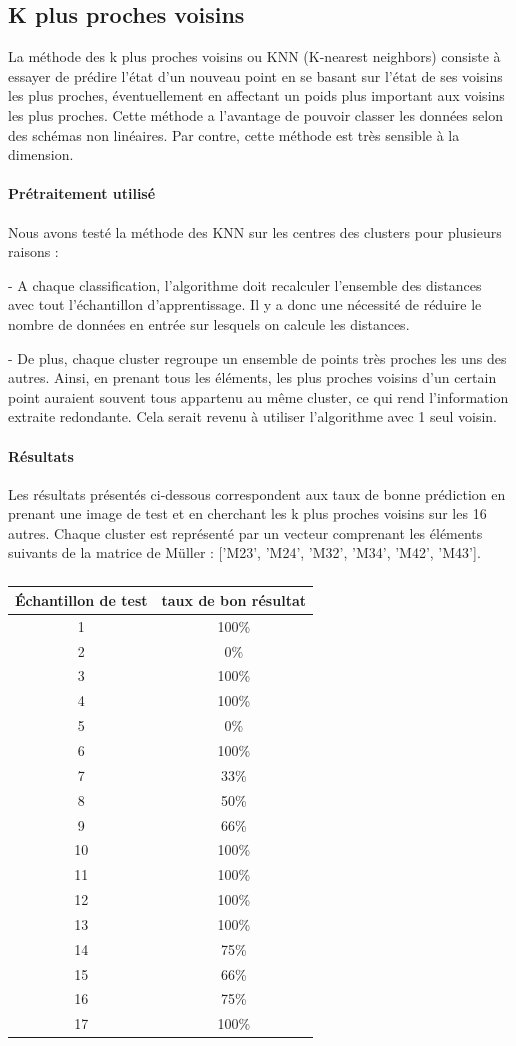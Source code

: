 \documentclass[a4paper,10pt]{report}
\begin{document}
\subsection{K plus proches voisins}
La méthode des k plus proches voisins ou KNN (K-nearest neighbors) consiste à essayer de prédire l’état d'un nouveau point en se basant sur l'état de ses voisins les plus proches, éventuellement en affectant un poids plus important aux voisins les plus proches. Cette méthode a l'avantage de pouvoir classer les données selon des schémas non linéaires. Par contre, cette méthode est très sensible à la dimension. 
\paragraph{Prétraitement utilisé}
Nous avons testé la méthode des KNN sur les centres des clusters pour plusieurs raisons :

- A chaque classification, l'algorithme doit recalculer l'ensemble des distances avec tout l’échantillon d'apprentissage. Il y a donc une nécessité de réduire le nombre de données en entrée sur lesquels on calcule les distances.

- De plus, chaque cluster regroupe un ensemble de points très proches les uns des autres. Ainsi, en prenant tous les éléments, les plus proches voisins d'un certain point auraient souvent tous appartenu au même cluster, ce qui rend l'information extraite redondante. Cela serait revenu à utiliser l'algorithme avec 1 seul voisin. 
\paragraph{Résultats}
Les résultats présentés ci-dessous correspondent aux taux de bonne prédiction en prenant une image de test et en cherchant les k plus proches voisins sur les 16 autres. Chaque cluster est représenté par un vecteur comprenant les éléments suivants de la matrice de Müller : ['M23', 'M24', 'M32', 'M34', 'M42', 'M43'].
\subparagraph{}
\begin{center}
\begin{tabular}{|c|c|}  
  \hline
  Échantillon de test & taux de bon résultat \\
  \hline
  1 & 100\%\\
  2 & 0\%\\
  3 & 100\%\\
  4 & 100\%\\
  5 & 0\%\\
  6  & 100\%\\
  7 & 33\%\\  
  8 & 50\%\\
  9 & 66\%\\
  10 & 100\%\\
  11 & 100\%\\
  12 & 100\%\\
  13 & 100\%\\
  14 & 75\%\\
  15 & 66\%\\
  16 & 75\%\\
  17 & 100\%\\ 
  \hline
\end{tabular}
\end{center}
\end{document}
